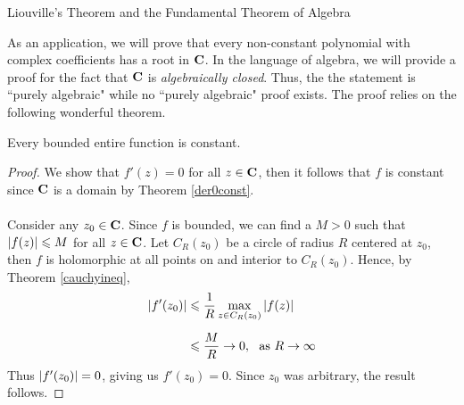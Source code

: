 \begin{mdframed}
\begin{center}
{\Large Liouville's Theorem and the Fundamental Theorem of Algebra}
\end{center}
\end{mdframed}
As an application, we will prove that every non-constant polynomial with complex coefficients has a root in $\mathbf C$. In the language of algebra, we will provide a proof for the fact that $\mathbf C$ is \emph{algebraically closed}. Thus, the the statement is ``purely algebraic" while no ``purely algebraic" proof exists. The proof relies on the following wonderful theorem. 

\vspace*{1em}

\begin{theorem}\label{liouville}
Every bounded entire function is constant. 
\end{theorem}
\begin{proof}
We show that $f'(z) = 0$ for all $z \in \mathbf C$, then it follows that $f$ is constant since $\mathbf C$ is a domain by Theorem \ref{der0const}.\\
\\
Consider any $z_0 \in \mathbf C$. Since $f$ is bounded, we can find a $M>0$ such that $\left\lvert f(z)\right\rvert \leqslant M$ for all $z \in \mathbf C$. Let $C_R(z_0)$ be a circle of radius $R$ centered at $z_0$, then $f$ is holomorphic at all points on and interior to $C_R(z_0)$. Hence, by Theorem \ref{cauchyineq},
\begin{align*}
\left\lvert f'(z_0)\right\rvert &\leqslant \frac{1}{R}\max_{z \in C_R(z_0)}\left\lvert f(z)\right\rvert\\[0.5em]
&\leqslant \frac{M}{R} \to 0,\ \text{ as } R \to \infty
\end{align*}
Thus $\left\lvert f'(z_0)\right\rvert = 0$, giving us $f'(z_0) = 0$. Since $z_0$ was arbitrary, the result follows. 
\end{proof} 

\vspace*{1em}

